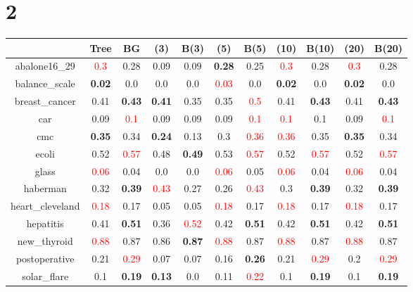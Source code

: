 \documentclass{article}%
\begin{document}
\section*{2}%
\begin{tabular}{c|cccccccccc}%
\hline%
&Tree&BG&(3)&B(3)&(5)&B(5)&(10)&B(10)&(20)&B(20)\\%
\hline%
abalone16\_29&\textcolor{red}{ 
0.3
}&0.28&0.09&0.09&\textbf{0.28}&0.25&\textcolor{red}{ 
0.3
}&0.28&\textcolor{red}{ 
0.3
}&0.28\\%
\hline%
balance\_scale&\textbf{0.02}&0.0&0.0&0.0&\textcolor{red}{ 
0.03
}&0.0&\textbf{0.02}&0.0&\textbf{0.02}&0.0\\%
\hline%
breast\_cancer&0.41&\textbf{0.43}&\textbf{0.41}&0.35&0.35&\textcolor{red}{ 
0.5
}&0.41&\textbf{0.43}&0.41&\textbf{0.43}\\%
\hline%
car&0.09&\textcolor{red}{ 
0.1
}&0.09&0.09&0.09&\textcolor{red}{ 
0.1
}&\textcolor{red}{ 
0.1
}&0.1&0.09&\textcolor{red}{ 
0.1
}\\%
\hline%
cmc&\textbf{0.35}&0.34&\textbf{0.24}&0.13&0.3&\textcolor{red}{ 
0.36
}&\textcolor{red}{ 
0.36
}&0.35&\textbf{0.35}&0.34\\%
\hline%
ecoli&0.52&\textcolor{red}{ 
0.57
}&0.48&\textbf{0.49}&0.53&\textcolor{red}{ 
0.57
}&0.52&\textcolor{red}{ 
0.57
}&0.52&\textcolor{red}{ 
0.57
}\\%
\hline%
glass&\textcolor{red}{ 
0.06
}&0.04&0.0&0.0&\textcolor{red}{ 
0.06
}&0.05&\textcolor{red}{ 
0.06
}&0.04&\textcolor{red}{ 
0.06
}&0.04\\%
\hline%
haberman&0.32&\textbf{0.39}&\textcolor{red}{ 
0.43
}&0.27&0.26&\textcolor{red}{ 
0.43
}&0.3&\textbf{0.39}&0.32&\textbf{0.39}\\%
\hline%
heart\_cleveland&\textcolor{red}{ 
0.18
}&0.17&0.05&0.05&\textcolor{red}{ 
0.18
}&0.17&\textcolor{red}{ 
0.18
}&0.17&\textcolor{red}{ 
0.18
}&0.17\\%
\hline%
hepatitis&0.41&\textbf{0.51}&0.36&\textcolor{red}{ 
0.52
}&0.42&\textbf{0.51}&0.42&\textbf{0.51}&0.42&\textbf{0.51}\\%
\hline%
new\_thyroid&\textcolor{red}{ 
0.88
}&0.87&0.86&\textbf{0.87}&\textcolor{red}{ 
0.88
}&0.87&\textcolor{red}{ 
0.88
}&0.87&\textcolor{red}{ 
0.88
}&0.87\\%
\hline%
postoperative&0.21&\textcolor{red}{ 
0.29
}&0.07&0.07&0.16&\textbf{0.26}&0.21&\textcolor{red}{ 
0.29
}&0.2&\textcolor{red}{ 
0.29
}\\%
\hline%
solar\_flare&0.1&\textbf{0.19}&\textbf{0.13}&0.0&0.11&\textcolor{red}{ 
0.22
}&0.1&\textbf{0.19}&0.1&\textbf{0.19}\\%

\end{tabular}
\end{document}
